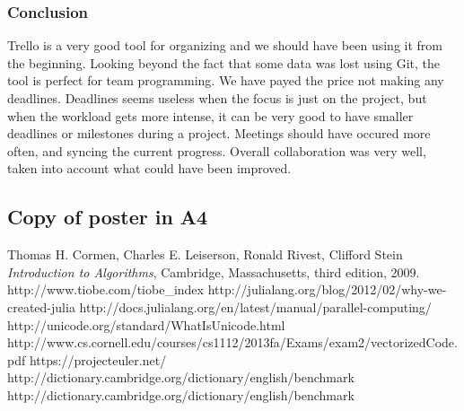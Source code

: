 \documentclass[a4paper, 11pt, titlepage]{article}
\begin{document}
\subsubsection{Conclusion}
Trello is a very good tool for organizing and we should have been using it from the beginning. Looking beyond the fact that some data was lost using Git, the tool is perfect for team programming. We have payed the price not making any deadlines. Deadlines seems useless when the focus is just on the project, but when the workload gets more intense, it can be very good to have smaller deadlines or milestones during a project. Meetings should have occured more often, and syncing the current progress. Overall collaboration was very well, taken into account what could have been improved.

\subsection{Copy of poster in A4}

\begin{thebibliography}{9}
	
	Thomas H. Cormen, Charles E. Leiserson, Ronald Rivest, Clifford Stein
	\emph{Introduction to Algorithms},
	Cambridge, Massachusetts,
	third edition,
	2009.
	http://www.tiobe.com/tiobe\_index
	http://julialang.org/blog/2012/02/why-we-created-julia
	http://docs.julialang.org/en/latest/manual/parallel-computing/
	http://unicode.org/standard/WhatIsUnicode.html
	http://www.cs.cornell.edu/courses/cs1112/2013fa/Exams/exam2/vectorizedCode.pdf
	https://projecteuler.net/
	http://dictionary.cambridge.org/dictionary/english/benchmark
	http://dictionary.cambridge.org/dictionary/english/benchmark
	
\end{thebibliography}
\end{document}
